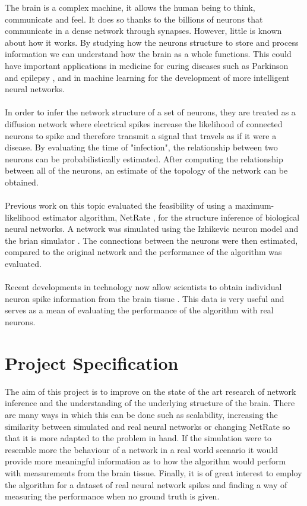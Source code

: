 \documentclass[11pt]{article}
\begin{document}
The brain is a complex machine, it allows the human being to think, communicate and feel. It does so thanks to the billions of neurons that communicate in a dense network through synapses. However, little is known about how it works. By studying how the neurons structure to store and process information we can understand how the brain as a whole functions. This could have important applications in medicine for curing diseases such as Parkinson \cite{OldeDubbelinkKimT.E.2014Dbnt} and epilepsy \cite{PONTEN2007918}, and in machine learning for the development of more intelligent neural networks.
\\\\
In order to infer the network structure of a set of neurons, they are treated as a diffusion network where electrical spikes increase the likelihood of connected neurons to spike and therefore transmit a signal that travels as if it were a disease. By evaluating the time of "infection", the relationship between two neurons can be probabilistically estimated. After computing the relationship between all of the neurons, an estimate of the topology of the network can be obtained. 
\\\\
Previous work on this topic \cite{pranav_report, alexandru2018estimating} evaluated the feasibility of using a maximum-likelihood estimator algorithm, NetRate \cite{rodriguez2011uncovering}, for the structure inference of biological neural networks. A network was simulated using the Izhikevic neuron model \cite{izhikevich2003simple} and the brian simulator \cite{10.3389/neuro.01.026.2009}. The connections between the neurons were then estimated, compared to the original network and the performance of the algorithm was evaluated.
\\\\
Recent developments in technology now allow scientists to obtain individual neuron spike information from the brain tissue \cite{ito2016spontaneous, ito2014large, litke2004does}. This data is very useful and serves as a mean of evaluating the performance of the algorithm with real neurons.

\section{Project Specification}


The aim of this project is to improve on the state of the art research of network inference and the understanding of the underlying structure of the brain. There are many ways in which this can be done such as scalability, increasing the similarity between simulated and real neural networks or changing NetRate so that it is more adapted to the problem in hand. If the simulation were to resemble more the behaviour of a network in a real world scenario it would provide more meaningful information as to how the algorithm would perform with measurements from the brain tissue. Finally, it is of great interest to employ the algorithm for a dataset of real neural network spikes and finding a way of measuring the performance when no ground truth is given.
\end{document}
